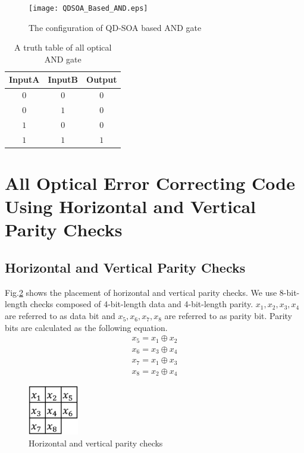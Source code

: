 \documentclass[twocolumn,a4paper]{article}
\begin{document}
\begin{figure}[htbp]
\begin{center}
  \texttt{[image: QDSOA\_Based\_AND.eps]}
  \caption{The configuration of QD-SOA based AND gate}
 \label{figure:and_gate}
\end{center}
\end{figure}

\renewcommand{\arraystretch}{1.5}
\begin{table}[htbp]
\begin{center}
 \small
 \caption{A truth table of all optical AND gate}
 \label{table:and_table}
 \begin{tabular}{c c c}
  \hline
  InputA & InputB & Output \\
  \hline
  $0$ & $0$ & $0$ \\
  $0$ & $1$ & $0$ \\
  $1$ & $0$ & $0$ \\
  $1$ & $1$ & $1$ \\
  \hline
  \end{tabular}
\end{center}
\end{table}
\renewcommand{\arraystretch}{1.0}

\section{All Optical Error Correcting Code Using Horizontal and Vertical Parity Checks}
\subsection{Horizontal and Vertical Parity Checks}
Fig.{\ref{figure:checks}} shows the placement of horizontal and vertical parity checks. We use 8-bit-length checks composed of 4-bit-length data and 4-bit-length parity. $x_1,x_2,x_3,x_4$ are referred to as data bit and $x_5,x_6,x_7,x_8$ are referred to as parity bit. Parity bits are calculated as the following equation.
\begin{eqnarray}
  x_5 = x_1 \oplus x_2 \\
  x_6 = x_3 \oplus x_4 \\
  x_7 = x_1 \oplus x_3 \\
  x_8 = x_2 \oplus x_4 
\end{eqnarray}

\begin{figure}[htbp]
\begin{center}
  \includegraphics[width=22mm]{Parity.eps}
  \caption{Horizontal and vertical parity checks}
  \label{figure:checks}
\end{center}
\end{figure}
\end{document}
